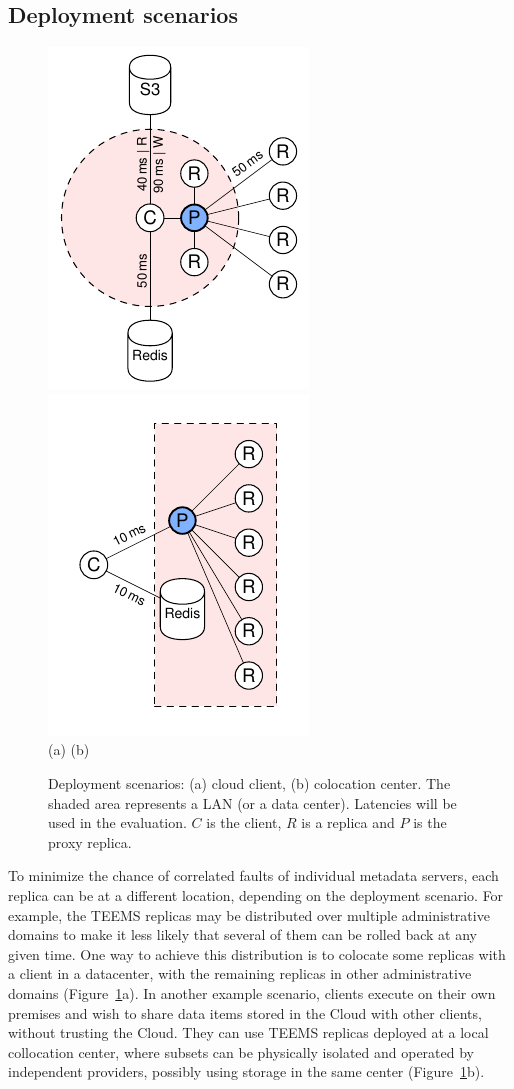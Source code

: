 \subsection{Deployment scenarios}

\begin{figure}[t] \centering
        \includegraphics[width=.32\linewidth]{ps/diag-2}
        \includegraphics[width=.32\linewidth]{ps/diag-3}\\
        (a) \hspace{2.7cm} (b)
    \caption{Deployment scenarios: (a) cloud client, (b) colocation center. The shaded area represents a
    LAN (or a data center). Latencies will be used in the evaluation.
    $C$ is the client, $R$ is a replica and $P$ is the proxy replica.
    }\label{fig:deployments}
\end{figure}


To minimize the chance of correlated faults of individual metadata
servers, each replica can be at a different location, depending on the
deployment scenario. For example, the \ac{TEEMS} replicas may be
distributed over multiple administrative domains to make it less
likely that several of them can be rolled back at any given time. One
way to achieve this distribution is to colocate some replicas with a
client in a datacenter, with the remaining replicas in other
administrative domains (Figure~\ref{fig:deployments}a).  In another
example scenario, clients execute on their own premises and wish to
share data items stored in the Cloud with other clients, without
trusting the Cloud. They can use \ac{TEEMS} replicas deployed at a local
collocation center, where subsets can be physically isolated and
operated by independent providers, possibly using storage in the same
center (Figure~\ref{fig:deployments}b).


